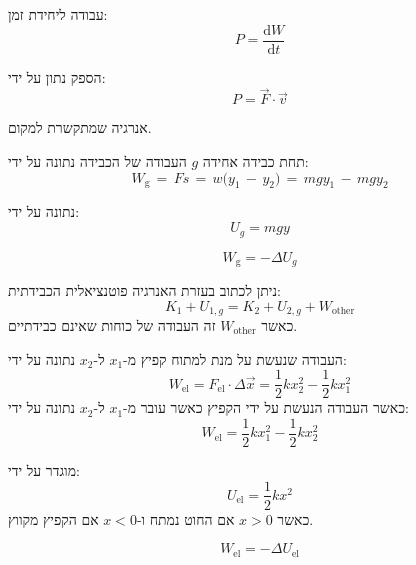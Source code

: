 \documentclass{tstextbook}
\begin{document}
\begin{definition}[הספק]
עבודה ליחידת זמן:
$$P=\frac{\mathrm{d} W}{\mathrm{d} t} $$

\end{definition}
\begin{proposition}
הספק נתון על ידי:
$$P=\vec{F}\cdot \vec{v}$$

\end{proposition}
\begin{definition}
אנרגיה שמתקשרת למקום.

\end{definition}
\begin{proposition}
תחת כבידה אחידה \(g\) העבודה של הכבידה נתונה על ידי:
$$W_{\mathrm{g}}\,=\,F s\,=\,w\bigl(y_{1}\,-\,y_{2}\bigr)\,=\,m g y_{1}\,-\,m g y_{2}$$

\end{proposition}
\begin{definition}
נתונה על ידי:
$$U_{g}=mgy$$

\end{definition}
\begin{corollary}
$$W_{\text{g}}=-\Delta U_{g}$$

\end{corollary}
\begin{proposition}
ניתן לכתוב בעזרת האנרגיה פוטנציאלית הכבידתית:
$$K_{1}+U_{1,g}=K_{2}+U_{2,g}+W_{\text{other}}$$
כאשר \(W_{\text{other}}\) זה העבודה של כוחות שאינם כבידתיים.

\end{proposition}
\begin{proposition}
העבודה שנעשת על מנת למתוח קפיץ מ-\(x_{1}\) ל-\(x_{2}\) נתונה על ידי:
$$W_{\text{el}}=F_{\text{el}}\cdot \Delta \vec{x}=\frac{1}{2}kx_{2}^{2}-\frac{1}{2}kx_{1}^{2}$$
כאשר העבודה הנעשת על ידי הקפיץ כאשר עובר מ-\(x_{1}\) ל-\(x_{2}\) נתונה על ידי:
$$W_{\text{el}}=\frac{1}{2}kx_{1}^{2}-\frac{1}{2}kx_{2}^{2}$$

\end{proposition}
\begin{definition}
מוגדר על ידי:
$$U_{\text{el}}=\frac{1}{2}kx^{2}$$
כאשר \(x>0\) אם החוט נמתח ו-\(x<0\) אם הקפיץ מקווץ.

\end{definition}
\begin{corollary}
$$W_{\text{el}}=-\Delta U_{\text{el}}$$

\end{corollary}
\end{document}
